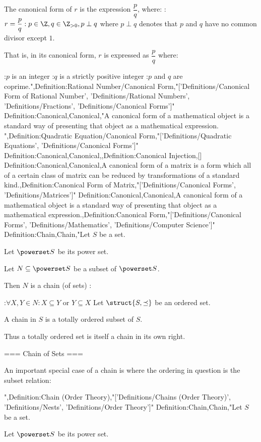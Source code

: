 The canonical form of $r$ is the expression $\dfrac p q$, where:
:$r = \dfrac p q: p \in \Z, q \in \Z_{>0}, p \perp q$
where $p \perp q$ denotes that $p$ and $q$ have no common divisor except $1$.


That is, in its canonical form, $r$ is expressed as $\dfrac p q$ where:

:$p$ is an integer
:$q$ is a strictly positive integer
:$p$ and $q$ are coprime.",Definition:Rational Number/Canonical Form,"['Definitions/Canonical Form of Rational Number', 'Definitions/Rational Numbers', 'Definitions/Fractions', 'Definitions/Canonical Forms']"
Definition:Canonical,Canonical,"A canonical form of a mathematical object is a standard way of presenting that object as a mathematical expression.
",Definition:Quadratic Equation/Canonical Form,"['Definitions/Quadratic Equations', 'Definitions/Canonical Forms']"
Definition:Canonical,Canonical,,Definition:Canonical Injection,[]
Definition:Canonical,Canonical,A canonical form of a matrix is a form which all of a certain class of matrix can be reduced by transformations of a standard kind.,Definition:Canonical Form of Matrix,"['Definitions/Canonical Forms', 'Definitions/Matrices']"
Definition:Canonical,Canonical,A canonical form of a mathematical object is a standard way of presenting that object as a mathematical expression.,Definition:Canonical Form,"['Definitions/Canonical Forms', 'Definitions/Mathematics', 'Definitions/Computer Science']"
Definition:Chain,Chain,"Let $S$ be a set.

Let $\powerset S$ be its power set.

Let $N \subseteq \powerset S$ be a subset of $\powerset S$.


Then $N$ is a chain (of sets) :

:$\forall X, Y \in N: X \subseteq Y$ or $Y \subseteq X$
Let $\struct {S, \preceq}$ be an ordered set.


A chain in $S$ is a totally ordered subset of $S$.


Thus a totally ordered set is itself a chain in its own right.


=== Chain of Sets ===

An important special case of a chain is where the ordering in question is the subset relation:


",Definition:Chain (Order Theory),"['Definitions/Chains (Order Theory)', 'Definitions/Nests', 'Definitions/Order Theory']"
Definition:Chain,Chain,"Let $S$ be a set.

Let $\powerset S$ be its power set.

